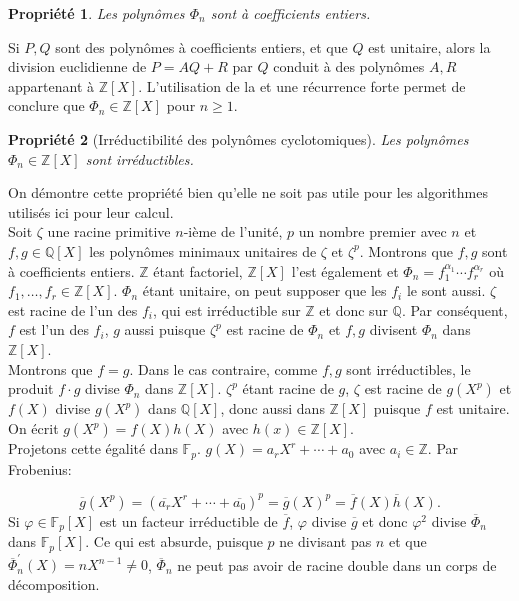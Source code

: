 \documentclass{article}
\theoremstyle{break}                  %
\newtheorem{propriete}{Propriété}
\begin{document}
\begin{propriete}
	Les polynômes $\Phi_n$ sont à coefficients entiers.
\end{propriete}
Si $P, Q$ sont des polynômes à coefficients entiers, et que $Q$ est unitaire, alors la division euclidienne de $P = AQ + R$ par $Q$ conduit à des polynômes $A,R$ appartenant à $\mathbb Z[X]$. L'utilisation de la  et une récurrence forte permet de conclure que $\Phi_n \in \mathbb Z[X]$ pour $n \ge 1$.

\begin{propriete}[Irréductibilité des polynômes cyclotomiques]
	Les polynômes $\Phi_n \in \mathbb Z[X]$ sont irréductibles.
\end{propriete}
On démontre cette propriété bien qu'elle ne soit pas utile pour les algorithmes utilisés ici pour leur calcul.\\

Soit $\zeta$ une racine primitive $n$-ième de l'unité, $p$ un nombre premier avec $n$ et $f,g \in \mathbb Q[X]$ les polynômes minimaux unitaires de $\zeta$ et $\zeta^p$. Montrons que $f,g$ sont à coefficients entiers. $\mathbb Z$ étant factoriel, $\mathbb Z[X]$ l'est également et $\Phi_n = f_1^{\alpha_1} \cdots f_r^{\alpha_r}$ où $f_1, \dots ,f_r \in \mathbb Z[X]$. $\Phi_n$ étant unitaire, on peut supposer que les $f_i$ le sont aussi. $\zeta$ est racine de l'un des $f_i$, qui est irréductible sur $\mathbb Z$ et donc sur $\mathbb Q$. Par conséquent, $f$ est l'un des $f_i$, $g$ aussi puisque $\zeta^p$ est racine de $\Phi_n$ et $f,g$ divisent $\Phi_n$ dans $\mathbb Z[X]$.\\

Montrons que $f=g$. Dans le cas contraire, comme $f,g$ sont irréductibles, le produit $f \cdot g$ divise $\Phi_n$ dans $\mathbb Z[X]$. $\zeta^p$ étant racine de $g$, $\zeta$ est racine de $g(X^p)$ et $f(X)$ divise $g(X^p)$ dans $\mathbb Q[X]$, donc aussi dans $\mathbb Z[X]$ puisque $f$ est unitaire. On écrit $g(X^p) = f(X)h(X)$ avec $h(x) \in \mathbb Z[X]$.\\

Projetons cette égalité dans $\mathbb F_p$. $g(X) = a_r X^r + \cdots + a_0$ avec $a_i \in \mathbb Z$. Par Frobenius:

$$\overline{g}(X^p) = (\overline{a_r} X^r + \cdots + \overline{a_0})^p = \overline{g}(X)^p = \overline{f}(X) \overline{h}(X).$$ Si $\varphi \in \mathbb F_p[X]$ est un facteur irréductible de $\overline{f}$, $\varphi$ divise $\overline{g}$ et donc $\varphi^2$ divise $\overline{\Phi}_n$ dans $\mathbb F_p[X]$. Ce qui est absurde, puisque $p$ ne divisant pas $n$ et que $\overline{\Phi}_n^\prime(X) = n X^{n-1} \neq 0$, $\overline{\Phi}_n$ ne peut pas avoir de racine double dans un corps de décomposition.\\
\end{document}
